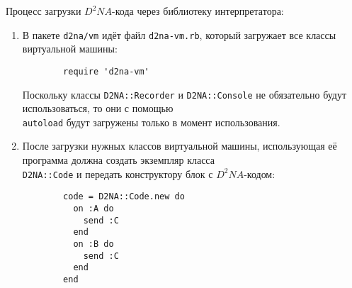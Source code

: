 \documentclass[utf8,a5paper,portrait,10pt,twoside]{eskdtext}
\begin{document}
Процесс загрузки $D^2NA$-кода через библиотеку интерпретатора:
\begin{enumerate}
  \item В пакете \texttt{d2na/vm} идёт файл \texttt{d2na-vm.rb}, который
        загружает все классы виртуальной машины:

        \begin{verbatim}
        require 'd2na-vm'
        \end{verbatim}

        Поскольку классы \texttt{D2NA::Recorder} и \texttt{D2NA::Console} не
        обязательно будут использоваться, то они с помощью\\ \texttt{autoload}
        будут загружены только в момент использования.
  \item После загрузки нужных классов виртуальной машины, использующая её 
        программа должна создать экземпляр класса\\ \texttt{D2NA::Code} и
        передать конструктору блок с $D^2NA$-кодом:

        \begin{verbatim}
        code = D2NA::Code.new do
          on :A do
            send :C
          end
          on :B do
            send :C
          end
        end
        \end{verbatim}


\end{enumerate}
\end{document}
